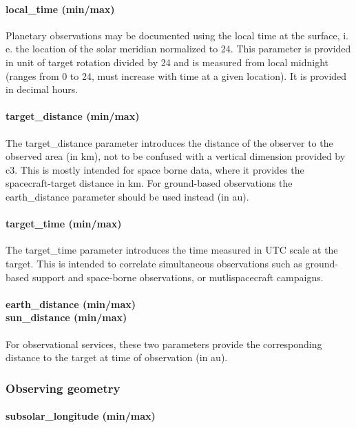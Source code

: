 \documentclass[11pt,a4paper]{ivoa}
\begin{document}
\paragraph{local\_time (min/max)}

Planetary observations may be documented using the local time at the surface, i. e. the location of the solar meridian normalized to 24. This parameter is provided in unit of target rotation divided by 24 and is measured from local midnight (ranges from 0 to 24, must increase with time at a given location). It is provided in decimal hours.

\paragraph{target\_distance (min/max)}

The target\_distance parameter introduces the distance of the observer to the observed area (in km), not to be confused with a vertical dimension provided by c3. This is mostly intended for space borne data, where it provides the spacecraft-target distance in km. For ground-based observations the earth\_distance parameter should be used instead (in au).

\paragraph{target\_time (min/max)}

The target\_time parameter introduces the time measured in UTC scale at the target. This is intended to correlate simultaneous observations such as ground-based support and space-borne observations, or mutlispacecraft campaigns.

\paragraph{earth\_distance (min/max)\\sun\_distance (min/max)}

For observational services, these two parameters provide the corresponding distance to the target at time of observation (in au).

\subsubsection{Observing geometry}

\paragraph{\textbf{subsolar\_longitude (min/max)}}
\end{document}

